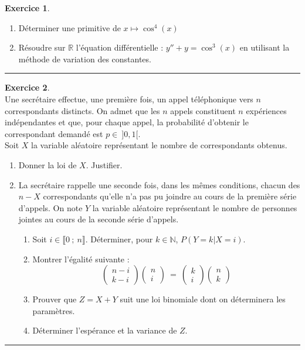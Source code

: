 \documentclass[a4paper,10pt]{article}
\theoremstyle{definition}
\theoremstyle{definition}
\newtheorem{exo}{Exercice}
\newcommand{\R}{\mathbb{R}}
\newcommand{\N}{\mathbb{N}}
\begin{document}
\begin{exo}\quad\\[0.25cm]
	\begin{enumerate}
		\item Déterminer une primitive de $x\longmapsto\cos^4(x)$
		\item Résoudre sur $\R$ l’équation différentielle : $y'' + y = \cos^3(x)$  en utilisant la méthode de variation des
		constantes.
	\end{enumerate}
	
	\centering
	\rule{1\linewidth}{0.6pt}
\end{exo}

\begin{exo}\textbf{}\quad\\[0.25cm]
Une secrétaire effectue, une première fois, un appel téléphonique vers $n$ correspondants distincts.
On admet que les $n$ appels constituent $n$ expériences indépendantes et que, pour chaque appel, la probabilité
d’obtenir le correspondant demandé est $p\in \ ]0,1[$.\\
Soit $X$ la variable aléatoire représentant le nombre de correspondants obtenus.
\begin{enumerate}
	\item Donner la loi de $X$. Justifier.
	\item La secrétaire rappelle une seconde fois, dans les mêmes conditions, chacun des $n - X$ correspondants qu’elle n’a pas pu joindre au cours de la première série d’appels. On note $Y$ la variable aléatoire représentant le nombre de personnes jointes au cours de la seconde série d’appels.
	\begin{enumerate}
		\item Soit $i \in\llbracket 0~;~ n \rrbracket $. Déterminer, pour $k\in\N$, $P (Y = k|X = i)$.
		\item Montrer l’égalité suivante : $$\begin{pmatrix}n-i\\k-i\end{pmatrix} \begin{pmatrix}n\\i\end{pmatrix}  \ = \  \begin{pmatrix}k\\i\end{pmatrix} \begin{pmatrix}n\\k\end{pmatrix}$$
		\item Prouver que $Z = X + Y$ suit une loi binomiale dont on déterminera les paramètres.
		\item Déterminer l’espérance et la variance de $Z$.
	\end{enumerate}
\end{enumerate}

\centering
\rule{1\linewidth}{0.6pt}
\end{exo}
\end{document}
